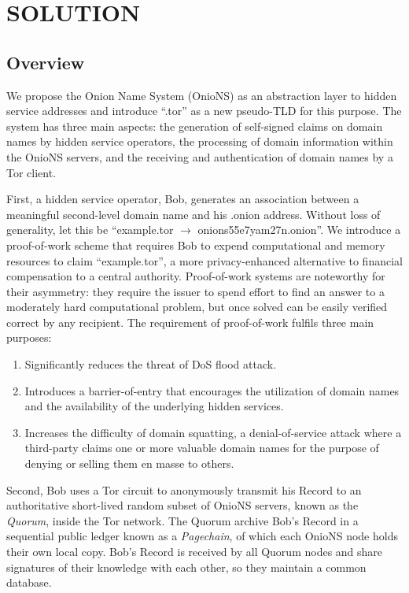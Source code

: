 
\chapter{SOLUTION}
\label{ch:Solution}

\section{Overview}

We propose the Onion Name System (OnioNS) as an abstraction layer to hidden service addresses and introduce ``.tor'' as a new pseudo-TLD for this purpose. The system has three main aspects: the generation of self-signed claims on domain names by hidden service operators, the processing of domain information within the OnioNS servers, and the receiving and authentication of domain names by a Tor client.

First, a hidden service operator, Bob, generates an association between a meaningful second-level domain name and his .onion address. Without loss of generality, let this be ``example.tor $ \rightarrow $ onions55e7yam27n.onion''. We introduce a proof-of-work scheme that requires Bob to expend computational and memory resources to claim ``example.tor'', a more privacy-enhanced alternative to financial compensation to a central authority. Proof-of-work systems are noteworthy for their asymmetry: they require the issuer to spend effort to find an answer to a moderately hard computational problem, but once solved can be easily verified correct by any recipient. The requirement of proof-of-work fulfils three main purposes:

\begin{enumerate}
	\item Significantly reduces the threat of DoS flood attack.
	\item Introduces a barrier-of-entry that encourages the utilization of domain names and the availability of the underlying hidden services.
	\item Increases the difficulty of domain squatting, a denial-of-service attack where a third-party claims one or more valuable domain names for the purpose of denying or selling them en masse to others.
\end{enumerate}

Second, Bob uses a Tor circuit to anonymously transmit his Record to an authoritative short-lived random subset of OnioNS servers, known as the \emph{Quorum}, inside the Tor network. The Quorum archive Bob's Record in a sequential public ledger known as a \emph{Pagechain}, of which each OnioNS node holds their own local copy. Bob's Record is received by all Quorum nodes and share signatures of their knowledge with each other, so they maintain a common database.

